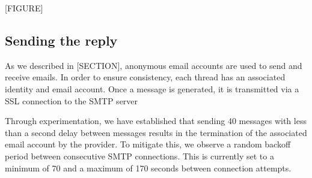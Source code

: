 [FIGURE]

\subsection{Sending the reply}

As we described in [SECTION], anonymous email accounts are used to send and receive emails. In order to ensure consistency, each thread has an associated identity and email account. Once a message is generated, it is transmitted via a SSL connection to the SMTP server

Through experimentation, we have established that sending 40 messages with less than a second delay between messages results in the termination of the associated email account by the provider. To mitigate this, we observe a random backoff period between consecutive SMTP connections. This is currently set to a minimum of 70 and a maximum of 170 seconds between connection attempts.